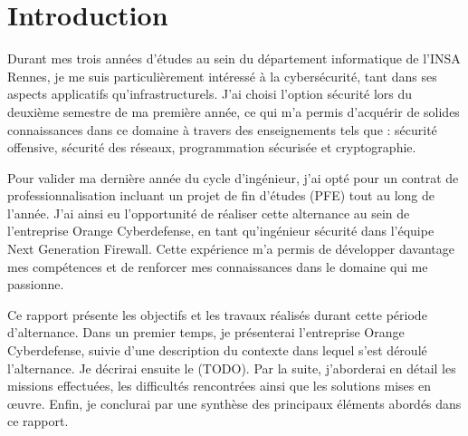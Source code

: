 \section{Introduction}
Durant mes trois années d’études au sein du département informatique de l'INSA Rennes, je me suis particulièrement intéressé à la cybersécurité, tant dans ses aspects applicatifs qu'infrastructurels. J’ai choisi l’option sécurité lors du deuxième semestre de ma première année, ce qui m’a permis d’acquérir de solides connaissances dans ce domaine à travers des enseignements tels que : sécurité offensive, sécurité des réseaux, programmation sécurisée et cryptographie.

Pour valider ma dernière année du cycle d’ingénieur, j’ai opté pour un contrat de professionnalisation incluant un projet de fin d’études (PFE) tout au long de l’année. J’ai ainsi eu l’opportunité de réaliser cette alternance au sein de l’entreprise Orange Cyberdefense, en tant qu’ingénieur sécurité dans l’équipe Next Generation Firewall. Cette expérience m’a permis de développer davantage mes compétences et de renforcer mes connaissances dans le domaine qui me passionne.

Ce rapport présente les objectifs et les travaux réalisés durant cette période d’alternance. Dans un premier temps, je présenterai l’entreprise Orange Cyberdefense, suivie d’une description du contexte dans lequel s’est déroulé l'alternance. Je décrirai ensuite le (TODO). Par la suite, j’aborderai en détail les missions effectuées, les difficultés rencontrées ainsi que les solutions mises en œuvre. Enfin, je conclurai par une synthèse des principaux éléments abordés dans ce rapport.